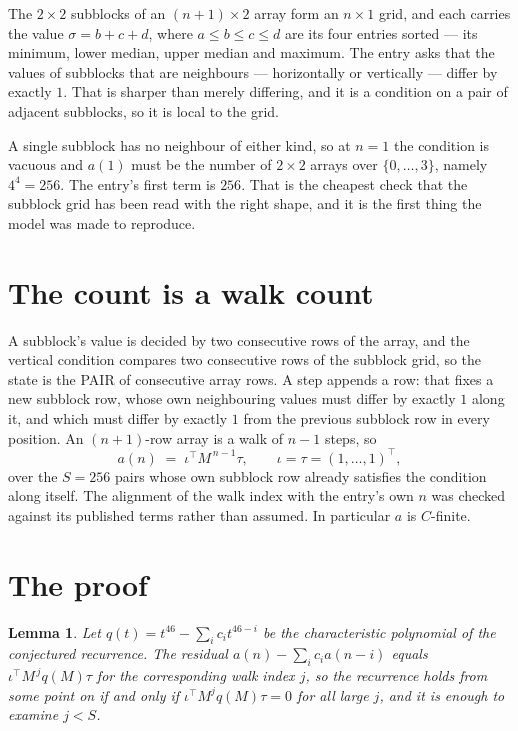 \documentclass[11pt,a4paper]{article}
\theoremstyle{plain}
\newtheorem{lemma}[theorem]{Lemma}
\theoremstyle{definition}
\begin{document}
The $2\times2$ subblocks of an $(n+1)\times2$ array form an
$n\times1$ grid, and each carries the value $\sigma=b+c+d$, where $a\le b\le c\le d$ are its four entries sorted --- its minimum, lower median, upper median and maximum. The entry asks that the values of
subblocks that are neighbours --- horizontally or vertically --- differ by exactly $1$.
That is sharper than merely differing, and it is a condition on a pair of adjacent subblocks,
so it is local to the grid.

A single subblock has no neighbour of either kind, so at $n=1$ the condition is vacuous and
$a(1)$ must be the number of $2\times2$ arrays over $\{0,\dots,3\}$, namely
$4^{4}=256$. The entry's first term is $256$.
That is the cheapest check that the subblock grid has been read with the right shape, and it
is the first thing the model was made to reproduce.

\section{The count is a walk count}

A subblock's value is decided by two consecutive rows of the array, and the
vertical condition compares two consecutive rows of the subblock grid, so the state is the
PAIR of consecutive array rows. A step appends a row: that fixes a new subblock row, whose own
neighbouring values must differ by exactly $1$ along it, and which must differ by exactly
$1$ from the previous subblock row in every position. An $(n+1)$-row array is a walk of
$n-1$ steps, so
\[
a(n)\;=\;\iota^{\!\top}M^{\,n-1}\tau,\qquad\iota=\tau=(1,\dots,1)^{\!\top},
\]
over the $S=256$ pairs whose own subblock row already satisfies the condition along itself.
The alignment of the walk index with the entry's own $n$ was checked against its published
terms rather than assumed. In particular $a$ is $C$-finite.

\section{The proof}

\begin{lemma}\label{lem:crit}
Let $q(t)=t^{46}-\sum_i c_it^{46-i}$ be the characteristic polynomial of the
conjectured recurrence. The residual $a(n)-\sum_ic_ia(n-i)$ equals
$\iota^{\!\top}M^{\,j}q(M)\tau$ for the corresponding walk index $j$, so the recurrence
holds from some point on if and only if $\iota^{\!\top}M^{j}q(M)\tau=0$ for all large $j$,
and it is enough to examine $j<S$.
\end{lemma}
\end{document}
